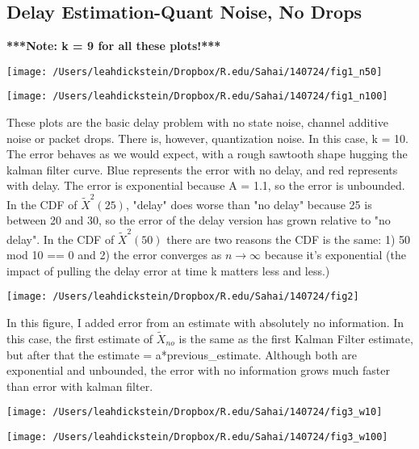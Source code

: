 \documentclass[leqno,twocolumn]{article}
\begin{document}
\subsection{Delay Estimation-Quant Noise, No Drops}
\textbf{***Note: k = 9 for all these plots!***}\\

\begin{minipage}[c]{0.5\textwidth}
\texttt{[image: /Users/leahdickstein/Dropbox/R.edu/Sahai/140724/fig1\_n50]}
\end{minipage}
\begin{minipage}[c]{0.5\textwidth}
\texttt{[image: /Users/leahdickstein/Dropbox/R.edu/Sahai/140724/fig1\_n100]}
\end{minipage}

These plots are the basic delay problem with no state noise, channel additive noise or packet drops. There is, however, quantization noise. In this case, k = 10. The error behaves as we would expect, with a rough sawtooth shape hugging the kalman filter curve. Blue represents the error with no delay, and red represents with delay. The error is exponential because A = 1.1, so the error is unbounded. In the CDF of $\tilde{X}^2(25)$, "delay" does worse than "no delay" because 25 is between 20 and 30, so the error of the delay version has grown relative to "no delay". In the CDF of $\tilde{X}^2(50)$ there are two reasons the CDF is the same: 1) 50 mod 10 == 0 and 2) the error converges as $n \rightarrow \infty$ because it's exponential (the impact of pulling the delay error at time k matters less and less.)

\begin{minipage}[c]{0.5\textwidth}
\texttt{[image: /Users/leahdickstein/Dropbox/R.edu/Sahai/140724/fig2]}
\end{minipage}
\begin{minipage}[b]{0.5\textwidth}
In this figure, I added error from an estimate with absolutely no information. In this case, the first estimate of $\tilde{X}_{no}$ is the same as the first Kalman Filter estimate, but after that the estimate = a*previous\_estimate. Although both are exponential and unbounded, the error with no information grows much faster than error with kalman filter.
\end{minipage}

\begin{minipage}[c]{0.5\textwidth}
\texttt{[image: /Users/leahdickstein/Dropbox/R.edu/Sahai/140724/fig3\_w10]}
\end{minipage}
\begin{minipage}[c]{0.5\textwidth}
\texttt{[image: /Users/leahdickstein/Dropbox/R.edu/Sahai/140724/fig3\_w100]}
\end{minipage}
\end{document}
